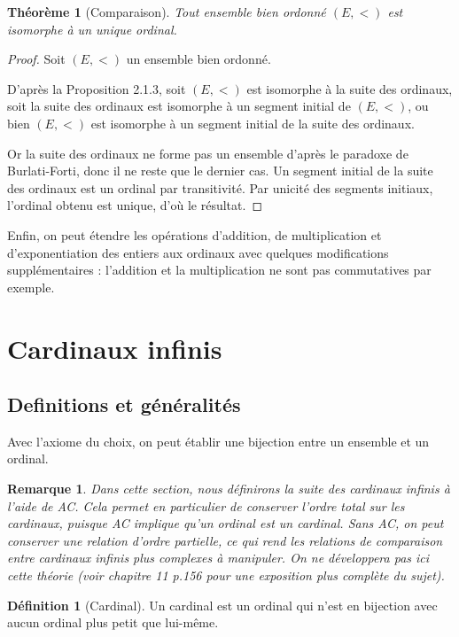 \documentclass[french]{article}
\theoremstyle{definition}
\newtheorem{definition}[subsubsection]{Définition}
\theoremstyle{plain}
\newtheorem{theorem}[subsubsection]{Théorème}
\theoremstyle{plain}
\theoremstyle{plain}
\theoremstyle{plain}
\newtheorem{remark}[subsubsection]{Remarque}
\theoremstyle{plain}
\begin{document}
\begin{theorem}[Comparaison]
	Tout ensemble bien ordonné \( (E,<) \) est isomorphe à un unique ordinal.
\end{theorem}
\begin{proof}
	Soit \( (E,<) \) un ensemble bien ordonné. 
	
	D'après la Proposition 2.1.3, soit \( (E,<) \) est isomorphe à la suite des ordinaux, soit la suite des ordinaux est isomorphe à un segment initial de \( (E,<) \), ou bien \( (E,<) \) est isomorphe à un segment initial de la suite des ordinaux.

	Or la suite des ordinaux ne forme pas un ensemble d'après le paradoxe de Burlati-Forti, donc il ne reste que le dernier cas. Un segment initial de la suite des ordinaux est un ordinal par transitivité. Par unicité des segments initiaux, l'ordinal obtenu est unique, d'où le résultat. 
\end{proof}

\par Enfin, on peut étendre les opérations d'addition, de multiplication et d'exponentiation des entiers aux ordinaux avec quelques modifications supplémentaires : l'addition et la multiplication ne sont pas commutatives par exemple.

\clearpage
\section{Cardinaux infinis}
\subsection{Definitions et généralités}

\par Avec l'axiome du choix, on peut établir une bijection entre un ensemble et un ordinal.

\begin{remark}
	Dans cette section, nous définirons la suite des cardinaux infinis à l'aide de AC. Cela permet en particulier de conserver l'ordre total sur les cardinaux, puisque AC implique qu'un ordinal est un cardinal. Sans AC, on peut conserver une relation d'ordre partielle, ce qui rend les relations de comparaison entre cardinaux infinis plus complexes à manipuler. On ne développera pas ici cette théorie (voir \cite{jech1973axiom} chapitre 11 p.156 pour une exposition plus complète du sujet).
\end{remark}

\begin{definition}[Cardinal]
	Un cardinal est un ordinal qui n'est en bijection avec aucun ordinal plus petit que lui-même.
\end{definition}
\end{document}
